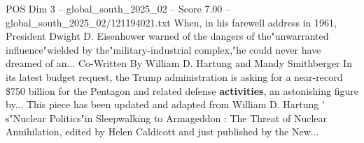\begin{textsample}{POS Dim 3 – global\_south\_2025\_02 – Score 7.00 – global\_south\_2025\_02/121194021.txt}
When, in his farewell address in 1961, President Dwight D.
Eisenhower warned of the dangers of the"unwarranted influence"wielded by the"military-industrial complex,"he could never have dreamed of an...
Co-Written By William D.
Hartung and Mandy Smithberger In its latest budget request, the Trump administration is asking for a near-record \$750 billion for the Pentagon and related defense \textbf{activities}, an astonishing figure by...
This piece has been updated and adapted from William D.
Hartung ' s"Nuclear Politics"in Sleepwalking to Armageddon : The Threat of Nuclear Annihilation, edited by Helen Caldicott and just published by the New...

\end{textsample}
